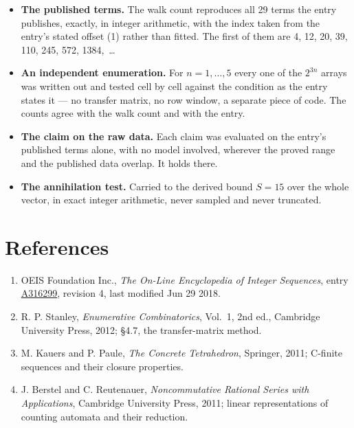 \documentclass[11pt]{article}
\theoremstyle{definition}
\begin{document}
\begin{itemize}

\item {\bfseries The published terms.} The walk count reproduces all 29 terms the entry publishes, exactly, in integer arithmetic, with the index taken from the entry's stated offset (1) rather than fitted. The first of them are 4, 12, 20, 39, 110, 245, 572, 1384,~\dots

\item {\bfseries An independent enumeration.} For $n = 1,\dots,5$ every one of the $2^{3n}$ arrays was written out and tested cell by cell against the condition as the entry states it --- no transfer matrix, no row window, a separate piece of code. The counts agree with the walk count and with the entry.

\item {\bfseries The claim on the raw data.} Each claim was evaluated on the entry's published terms alone, with no model involved, wherever the proved range and the published data overlap. It holds there.

\item {\bfseries The annihilation test.} Carried to the derived bound $S = 15$ over the whole vector, in exact integer arithmetic, never sampled and never truncated.

\end{itemize}

\section{References}

\begin{enumerate}

\item OEIS Foundation Inc., \emph{The On-Line Encyclopedia of Integer Sequences}, entry \href{https://oeis.org/A316299}{A316299}, revision 4, last modified Jun 29 2018.

\item R. P. Stanley, \emph{Enumerative Combinatorics}, Vol.~1, 2nd ed., Cambridge University Press, 2012; \S4.7, the transfer-matrix method.

\item M. Kauers and P. Paule, \emph{The Concrete Tetrahedron}, Springer, 2011; C-finite sequences and their closure properties.

\item J. Berstel and C. Reutenauer, \emph{Noncommutative Rational Series with Applications}, Cambridge University Press, 2011; linear representations of counting automata and their reduction.

\end{enumerate}
\end{document}
